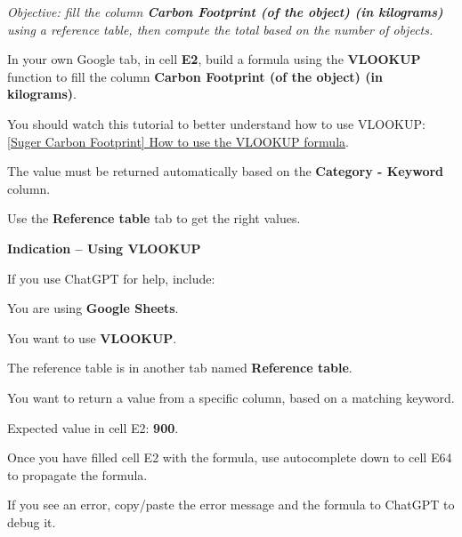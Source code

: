 \documentclass{exam}
\begin{document}
\textit{Objective: fill the column \textbf{Carbon Footprint (of the object) (in kilograms)} using a reference table, then compute the total based on the number of objects.}

\begin{questions}
  \question In your own Google tab, in cell \textbf{E2}, build a formula using the \textbf{VLOOKUP} function to fill the column \textbf{Carbon Footprint (of the object) (in kilograms)}.
  \begin{compactitem}
    \item You should watch this tutorial to better understand how to use VLOOKUP: \href{https://www.loom.com/share/cb344bfb182c4cf0b42e95f2e58bca24}{[Suger Carbon Footprint] How to use the VLOOKUP formula}.
    \item The value must be returned automatically based on the \textbf{Category - Keyword} column.
    \item Use the \textbf{Reference table} tab to get the right values.
  \end{compactitem}

  \begin{Indication}
  \textbf{Indication -- Using VLOOKUP}
  \begin{compactitem}
    \item If you use ChatGPT for help, include:
    \begin{compactitem}
      \item You are using \textbf{Google Sheets}.
      \item You want to use \textbf{VLOOKUP}.
      \item The reference table is in another tab named \textbf{Reference table}.
      \item You want to return a value from a specific column, based on a matching keyword.
    \end{compactitem}
    \item Expected value in cell E2: \textbf{900}.
  \end{compactitem}
  \end{Indication}

  \question Once you have filled cell E2 with the formula, use autocomplete down to cell E64 to propagate the formula.
  \begin{compactitem}
    \item If you see an error, copy/paste the error message and the formula to ChatGPT to debug it.
 


\end{compactitem}
\end{questions}
\end{document}
